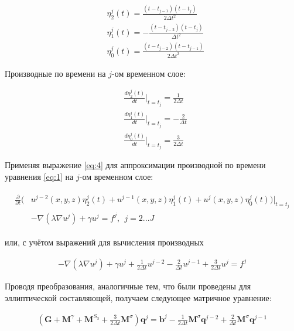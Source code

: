 \documentclass[12pt]{article}
\begin{document}
\begin{align}
  &\eta^j_2(t) = \frac{(t - t_{j-1})(t - t_j)}{2\Delta t^2} \\
  &\eta^j_1(t) = -\frac{(t - t_{j-2})(t - t_j)}{\Delta t^2} \\
  &\eta^j_0(t) = \frac{(t - t_{j-2})(t - t_{j-1})}{2\Delta t^2}
\end{align}

\vspace{5mm}
\noindent Производные по времени на $j$-ом временном слое:

\begin{align}
  &\frac{d\eta^j_2(t)}{dt}\bigg|_{t = t_j} = \frac{1}{2 \Delta t} \\
  &\frac{d\eta^j_1(t)}{dt}\bigg|_{t = t_j} = -\frac{2}{\Delta t} \\
  &\frac{d\eta^j_0(t)}{dt}\bigg|_{t = t_j} = \frac{3}{2 \Delta t}
\end{align}

\vspace{5mm}
\noindent Применяя выражение \ref{eq:4} для аппроксимации производной по времени уравнения \ref{eq:1}
  на $j$-ом временном слое:

\begin{align}
  \begin{split}
    \frac{\partial}{\partial t}(
      &u^{j-2}(x, y, z)\eta^j_2(t) + 
      u^{j-1}(x, y, z)\eta^j_1(t) +
      u^{j}(x, y, z)\eta^j_0(t)
    )\bigg|_{t = t_j} \\ 
    &- \nabla(\lambda \nabla u^j) + \gamma u^j = f^j, \ \ j = 2...J
  \end{split}
\end{align}

\vspace{5mm}
\noindent или, с учётом выражений для вычисления производных

\begin{align}
  -\nabla(\lambda \nabla u^j) + \gamma u^j + 
    \frac{1}{2 \Delta t} u^{j-2} -
    \frac{2}{\Delta t} u^{j-1} + 
    \frac{3}{2 \Delta t} u^j = f^j
\end{align}

\vspace{5mm}
\noindent Проводя преобразования, аналогичные тем, что были проведены для эллиптической составляющей, 
  получаем следующее матричное уравнение:

\begin{align}
  (\textbf{G} + \textbf{M}^{\gamma} + \textbf{M}^{S_3} + 
    \frac{3}{2 \Delta t}\textbf{M}^{\sigma})\textbf{q}^j = \textbf{b}^j 
      - \frac{1}{2 \Delta t}\textbf{M}^{\sigma}\textbf{q}^{j-2}
      + \frac{2}{\Delta t}\textbf{M}^{\sigma}\textbf{q}^{j-1}
\end{align}
\end{document}

